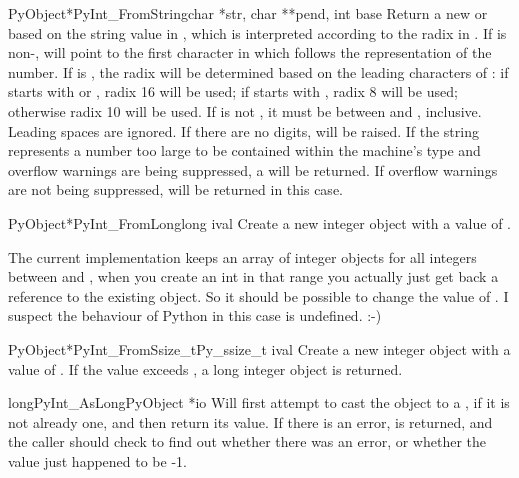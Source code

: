 \begin{cfuncdesc}{PyObject*}{PyInt_FromString}{char *str, char **pend,
                                               int base}
  Return a new  or  based on the
  string value in , which is interpreted according to the radix in
  .  If  is non-\NULL{},  will point to
  the first character in  which follows the representation of the
  number.  If  is , the radix will be determined based on
  the leading characters of : if  starts with 
  or , radix 16 will be used; if  starts with
  , radix 8 will be used; otherwise radix 10 will be used.  If
   is not , it must be between  and ,
  inclusive.  Leading spaces are ignored.  If there are no digits,
   will be raised.  If the string represents a number
  too large to be contained within the machine's  type and
  overflow warnings are being suppressed, a  will be
  returned.  If overflow warnings are not being suppressed, \NULL{} will be
  returned in this case.
\end{cfuncdesc}

\begin{cfuncdesc}{PyObject*}{PyInt_FromLong}{long ival}
  Create a new integer object with a value of .

  The current implementation keeps an array of integer objects for all
  integers between  and , when you create an int in
  that range you actually just get back a reference to the existing
  object. So it should be possible to change the value of .  I
  suspect the behaviour of Python in this case is undefined. :-)
\end{cfuncdesc}

\begin{cfuncdesc}{PyObject*}{PyInt_FromSsize_t}{Py_ssize_t ival}
  Create a new integer object with a value of .
  If the value exceeds , a long integer object is
  returned.

\end{cfuncdesc}

\begin{cfuncdesc}{long}{PyInt_AsLong}{PyObject *io}
  Will first attempt to cast the object to a , if
  it is not already one, and then return its value. If there is an
  error,  is returned, and the caller should check
   to find out whether there was an error, or
  whether the value just happened to be -1.
\end{cfuncdesc}

